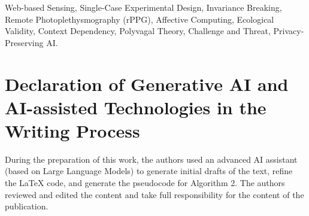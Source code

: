 \documentclass[journal]{IEEEtran}
\begin{document}
\begin{abstract}
\textbf{\textit{Results}}: Our results reveal a robust and significant interaction between environmental context and psychophysiological reactivity. 
A 2-way Analysis of Variance (ANOVA) demonstrated that while "Threat" framing significantly enhanced behavioral performance 
(Reaction Time acceleration, $p=0.002, d=-0.41$) and induced physiological freezing ($p=0.08, d=-0.33$) in the University setting, 
these effects were statistically indistinguishable from baseline in the Home environment ($p>0.30$, negligible effect sizes). 
Bayesian analysis provided strong evidence for this dissociation (BF$_{10}=66.7$ in Lab vs. BF$_{10}=1.7$ at Home). 
Furthermore, a Linear Mixed-Effects Model confirmed that these effects were not attributable to habituation over time.

\textbf{\textit{Conclusion}}: These findings provide empirical support for the "Safe Haven" hypothesis, suggesting that familiar, 
safe environments act as powerful moderators of the autonomic nervous system, effectively buffering the impact of cognitive stressors. 
We discuss the profound implications of this "Invariance Breaking" for the design of next-generation ubiquitous computing systems, 
arguing that future affective models must be dynamically parameterized by the user's environmental context 
to avoid catastrophic misinterpretation of physiological signals.
\end{abstract}

\begin{IEEEkeywords}
Web-based Sensing, Single-Case Experimental Design, Invariance Breaking, Remote Photoplethysmography (rPPG), 
Affective Computing, Ecological Validity, Context Dependency, Polyvagal Theory, Challenge and Threat, Privacy-Preserving AI.
\end{IEEEkeywords}

\section*{Declaration of Generative AI and AI-assisted Technologies in the Writing Process}
During the preparation of this work, the authors used an advanced AI assistant (based on Large Language Models) to generate initial drafts of the text, refine the LaTeX code, and generate the pseudocode for Algorithm 2. The authors reviewed and edited the content and take full responsibility for the content of the publication.
\end{document}
